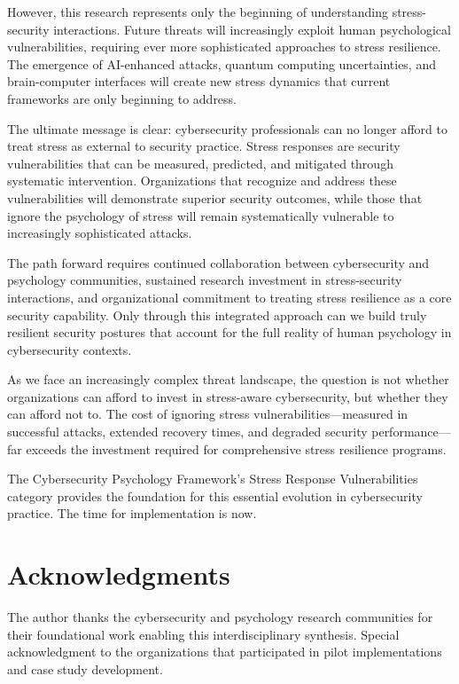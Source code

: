 \documentclass[11pt,a4paper]{article}
\begin{document}
However, this research represents only the beginning of understanding stress-security interactions. Future threats will increasingly exploit human psychological vulnerabilities, requiring ever more sophisticated approaches to stress resilience. The emergence of AI-enhanced attacks, quantum computing uncertainties, and brain-computer interfaces will create new stress dynamics that current frameworks are only beginning to address.

The ultimate message is clear: cybersecurity professionals can no longer afford to treat stress as external to security practice. Stress responses are security vulnerabilities that can be measured, predicted, and mitigated through systematic intervention. Organizations that recognize and address these vulnerabilities will demonstrate superior security outcomes, while those that ignore the psychology of stress will remain systematically vulnerable to increasingly sophisticated attacks.

The path forward requires continued collaboration between cybersecurity and psychology communities, sustained research investment in stress-security interactions, and organizational commitment to treating stress resilience as a core security capability. Only through this integrated approach can we build truly resilient security postures that account for the full reality of human psychology in cybersecurity contexts.

As we face an increasingly complex threat landscape, the question is not whether organizations can afford to invest in stress-aware cybersecurity, but whether they can afford not to. The cost of ignoring stress vulnerabilities—measured in successful attacks, extended recovery times, and degraded security performance—far exceeds the investment required for comprehensive stress resilience programs.

The Cybersecurity Psychology Framework's Stress Response Vulnerabilities category provides the foundation for this essential evolution in cybersecurity practice. The time for implementation is now.

\section*{Acknowledgments}

The author thanks the cybersecurity and psychology research communities for their foundational work enabling this interdisciplinary synthesis. Special acknowledgment to the organizations that participated in pilot implementations and case study development.
\end{document}
